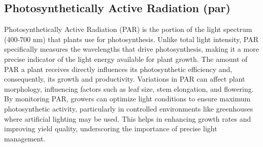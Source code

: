 \subsection{Photosynthetically Active Radiation (par)}

Photosynthetically Active Radiation (PAR) is the portion of the light spectrum (400-700 nm) that plants use for photosynthesis. Unlike total light intensity, PAR specifically measures the wavelengths that drive photosynthesis, making it a more precise indicator of the light energy available for plant growth. The amount of PAR a plant receives directly influences its photosynthetic efficiency and, consequently, its growth and productivity. Variations in PAR can affect plant morphology, influencing factors such as leaf size, stem elongation, and flowering. By monitoring PAR, growers can optimize light conditions to ensure maximum photosynthetic activity, particularly in controlled environments like greenhouses where artificial lighting may be used. This helps in enhancing growth rates and improving yield quality, underscoring the importance of precise light management.
